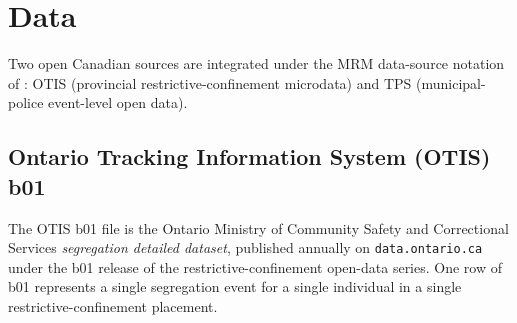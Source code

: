 \documentclass[article,shortnames,nojss]{jss}
\newcommand{\OTIS}{\textsf{OTIS}}
\newcommand{\TPS}{\textsf{TPS}}
\begin{document}
\section{Data}
\label{sec:data}

Two open Canadian sources are integrated under the MRM data-source
notation of \citet{Ruhela2026MRM}: \OTIS{} (provincial restrictive-confinement
microdata) and \TPS{} (municipal-police event-level open data).

\subsection[Ontario Tracking Information System (OTIS) b01]{Ontario Tracking Information System (\OTIS{}) b01}
\label{sec:data-otis}

The \OTIS{} b01 file is the Ontario Ministry of Community Safety and
Correctional Services \emph{segregation detailed dataset}, published
annually on \texttt{data.ontario.ca} under the b01 release of the
restrictive-confinement open-data series. One row of b01 represents
a single segregation event for a single individual in a single
restrictive-confinement placement.
\end{document}

